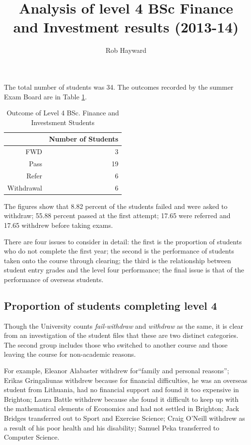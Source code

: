 \documentclass[12pt, a4paper, oneside]{article}\usepackage[]{graphicx}\usepackage[]{color}
\begin{document}
\title{Analysis of level 4 BSc Finance and Investment results (2013-14)}
\author{Rob Hayward}
\maketitle


The total number of students was 34.  The outcomes recorded by the summer Exam Board are in Table \ref{tabref:out}.  

\begin{table}[ht]
\centering
\begin{tabular}{rr}
  \hline
 & Number of Students \\ 
  \hline
FWD &   3 \\ 
  Pass &  19 \\ 
  Refer &   6 \\ 
  Withdrawal &   6 \\ 
   \hline
\end{tabular}
\caption{Outcome of Level 4 BSc. Finance and Investsment Students} 
\label{tabref:out}
\end{table}

The figures show that 8.82 percent of the students failed and were asked to withdraw;  55.88 percent passed at the first attempt; 17.65 were referred and 17.65 withdrew before taking exams.  

There are four issues to consider in detail: the first is the proportion of students who do not complete the first year; the second is the performance of students taken onto the course through clearing; the third is the relationship between student entry grades and the level four performance; the final issue is that of the performance of overseas students. 

\subsection*{Proportion of students completing level 4}
Though the University counts \emph{fail-withdraw} and \emph{withdraw} as the same, it is clear from an investigation of the student files that these are two distinct categories.  The second group includes those who switched to another course and those leaving the course for non-academic reasons. 

For example, Eleanor Alabaster withdrew for``family and personal reasons'';  Erikas Gringaliunas withdrew because for financial difficulties, he was an overseas student from Lithuania, had no financial support and found it too expensive in Brighton; Laura Battle withdrew because she found it difficult to keep up with the mathematical elements of Economics and had not settled in Brighton; Jack Bridges transferred out to Sport and Exercise Science; Craig O'Neill withdrew as a result of his poor health and his disability; Samuel Peka transferred to Computer Science. 
\end{document}
